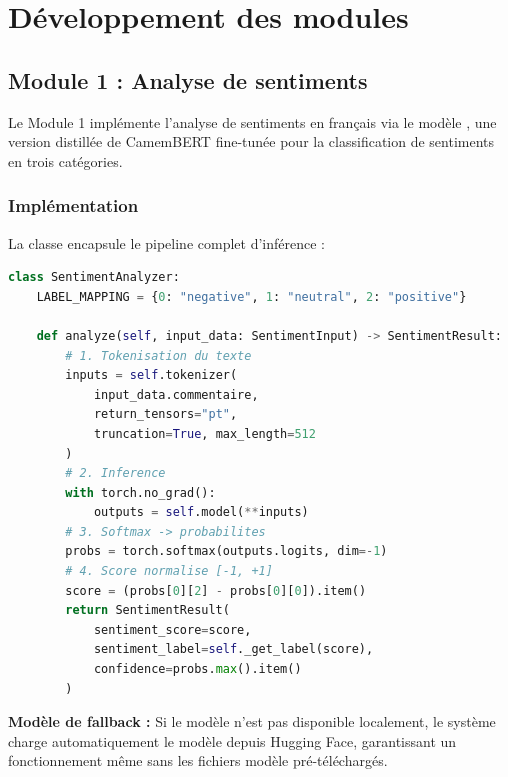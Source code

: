 \section{Développement des modules}

\subsection{Module 1 : Analyse de sentiments}

Le Module 1 implémente l'analyse de sentiments en français via le modèle , une version distillée de CamemBERT fine-tunée pour la classification de sentiments en trois catégories.

\subsubsection{Implémentation}

La classe  encapsule le pipeline complet d'inférence :

\begin{lstlisting}[language=Python, caption={Pipeline d'analyse de sentiments (simplifié)}]
class SentimentAnalyzer:
    LABEL_MAPPING = {0: "negative", 1: "neutral", 2: "positive"}

    def analyze(self, input_data: SentimentInput) -> SentimentResult:
        # 1. Tokenisation du texte
        inputs = self.tokenizer(
            input_data.commentaire,
            return_tensors="pt",
            truncation=True, max_length=512
        )
        # 2. Inference
        with torch.no_grad():
            outputs = self.model(**inputs)
        # 3. Softmax -> probabilites
        probs = torch.softmax(outputs.logits, dim=-1)
        # 4. Score normalise [-1, +1]
        score = (probs[0][2] - probs[0][0]).item()
        return SentimentResult(
            sentiment_score=score,
            sentiment_label=self._get_label(score),
            confidence=probs.max().item()
        )
\end{lstlisting}

\begin{infobox}
\textbf{Modèle de fallback :} Si le modèle  n'est pas disponible localement, le système charge automatiquement le modèle  depuis Hugging Face, garantissant un fonctionnement même sans les fichiers modèle pré-téléchargés.
\end{infobox}

